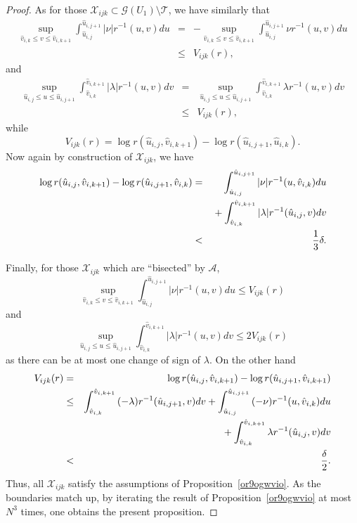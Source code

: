 \documentclass{article}
\begin{document}
{\begin{proof}
As for those $\mathcal{X}_{ijk}\subset
\mathcal{G}(U_1)\setminus\mathcal{T}$,
we have similarly that
\begin{eqnarray*}
\sup_{\hat{v}_{i,k}\le v\le \hat{v}_{i,k+1}}
\int_{\hat{u}_{i,j}}^{\hat{u}_{i,j+1}}{|\nu|r^{-1}(u,v)du}
&=&-\sup_{\hat{v}_{i,k}\le v\le \hat{v}_{i,k+1}}
\int_{\hat{u}_{i,j}}^{\hat{u}_{i,j+1}}{\nu r^{-1}(u,v)du}\\
&\le& V_{ijk}(r),
\end{eqnarray*}
and
\begin{eqnarray*}
\sup_{\hat{u}_{i,j}\le u\le \hat{u}_{i,j+1}}
\int_{\hat{v}_{i,k}}^{\hat{v}_{i,k+1}}{|\lambda|r^{-1}(u,v)dv}
&=&\sup_{\hat{u}_{i,j}\le u\le \hat{u}_{i,j+1}}
\int_{\hat{v}_{i,k}}^{\hat{v}_{i,k+1}}{\lambda r^{-1}(u,v)dv}\\
&\le& V_{ijk}(r),
\end{eqnarray*}
while
\[
V_{ijk} (r)=\log r(\hat{u}_{i,j},\hat{v}_{i,k+1})
-\log r(\hat{u}_{i,j+1},\hat{u}_{i,k}).
\]
Now again by construction of $\mathcal{X}_{ijk}$, we have
\begin{eqnarray*}
\log r(\hat{u}_{i,j},\hat{v}_{i,k+1})-\log r(\hat{u}_{i,j+1},\hat{v}_{i,k})&=&
\int_{\hat{u}_{i,j}}^{\hat{u}_{i,j+1}}{|\nu|r^{-1}(u,\hat{v}_{i,k})du}\\
&&\hbox{}+
\int_{\hat{v}_{i,k}}^{\hat{v}_{i,k+1}}{|\lambda|r^{-1}(\hat{u}_{i,j},v)dv}\\
&<&\frac13\delta.
\end{eqnarray*}

Finally, for those $\mathcal{X}_{ijk}$ which are ``bisected'' by
$\mathcal{A}$,
\[
\sup_{\hat{v}_{i,k}\le v\le \hat{v}_{i,k+1}}
\int_{\hat{u}_{i,j}}^{\hat{u}_{i,j+1}}
{|\nu|r^{-1}(u,v)du}\le V_{ijk}(r)
\]
and
\[
\sup_{\hat{u}_{i,j}\le u\le \hat{u}_{i,j+1}}
\int_{\hat{v}_{i,k}}^{\hat{v}_{i,k+1}}
{|\lambda|r^{-1}(u,v)dv}\le 2V_{ijk}(r)
\]
as there can be at most one change of sign of $\lambda$.
On the other hand
\begin{eqnarray*}
V_{ijk} (r)
&=&
\log r(\hat{u}_{i,j},\hat{v}_{i,k+1})-
\log r (\hat{u}_{i,j+1},\hat{v}_{i,k+1})\\
&\le&
\int_{\hat{v}_{i,k}}^{\hat{v}_{i,k+1}}{(-\lambda)r^{-1}(\hat{u}_{i,j+1},v)dv}+
\int_{\hat{u}_{i,j}}^{\hat{u}_{i,j+1}}
{(-\nu)r^{-1}(u,\hat{v}_{i,k})du}\\
&&\hbox{}+
\int_{\hat{v}_{i,k}}^{\hat{v}_{i,k+1}}
{\lambda r^{-1}(\hat{u}_{i,j},v)dv}\\
&<&
\frac\delta2.
\end{eqnarray*}
Thus, all $\mathcal{X}_{ijk}$ 
satisfy the assumptions of Proposition~\ref{or9ogwvio}.
As the boundaries match up, by 
iterating the result of Proposition~\ref{or9ogwvio} at most
$N^3$ times, one obtains
the present proposition. \end{proof}


}
\end{document}
